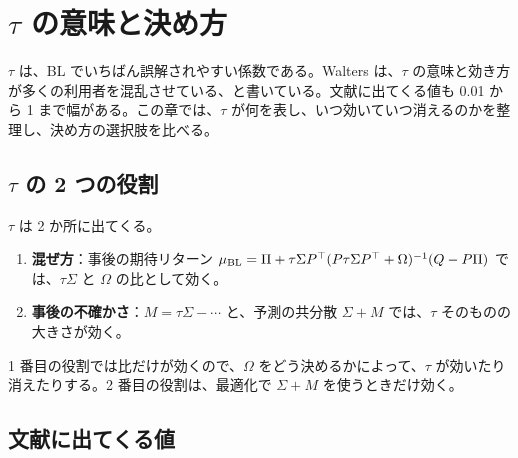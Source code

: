 \chapter{$\tau$ の意味と決め方}\label{ch:tau}

$\tau$ は、BL でいちばん誤解されやすい係数である。Walters は、$\tau$ の意味と効き方が多くの利用者を混乱させている、と書いている。文献に出てくる値も 0.01 から 1 まで幅がある。この章では、$\tau$ が何を表し、いつ効いていつ消えるのかを整理し、決め方の選択肢を比べる。

\section{$\tau$ の 2 つの役割}

$\tau$ は 2 か所に出てくる。

\begin{enumerate}
\item \textbf{混ぜ方}：事後の期待リターン $\mu_{\mathrm{BL}}=\Pi+\tau\Sigma P^{\top}(P\tau\Sigma P^{\top}+\Omega)^{-1}(Q-P\Pi)$ では、$\tau\Sigma$ と $\Omega$ の比として効く。
\item \textbf{事後の不確かさ}：$M=\tau\Sigma-\cdots$ と、予測の共分散 $\Sigma+M$ では、$\tau$ そのものの大きさが効く。
\end{enumerate}

1 番目の役割では比だけが効くので、$\Omega$ をどう決めるかによって、$\tau$ が効いたり消えたりする。2 番目の役割は、最適化で $\Sigma+M$ を使うときだけ効く。

\section{文献に出てくる値}

